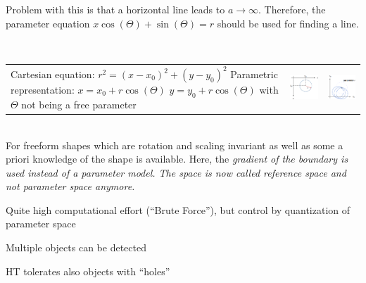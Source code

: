       Problem with this is that a horizontal line leads to $a \rightarrow \infty$. Therefore,
      the parameter equation $x \cos(\Theta) +  \sin(\Theta) = r$ should be used for finding
      a line.
      
      \\
      \begin{tabular}{lll}
        \parbox{8cm}{Cartesian equation:\\
           $r^2 = (x-x_0)^2 + (y-y_0)^2$ \\ \\
           Parametric representation:\\
           $x=x_0 + r \cos(\Theta)$\\
           $y=y_0+r\cos(\Theta)$\\
           with $\Theta$ not being a free parameter}
          & \parbox{5cm}{\includegraphics[width=4cm]{./images/hough_transform_circle.png}}
          & \parbox{5cm}{\includegraphics[width=4cm]{./images/hough_transform_circle2.png}}
      \end{tabular}
      
      
      \\
        For freeform shapes which are rotation and scaling invariant as well as some a priori 
        knowledge of the shape is available.
        Here, the \em gradient of the boundary \em is used instead of a parameter model. The space is now called \em reference
        space \em and not parameter space anymore.
        
        \begin{liste}
        	\item Quite high computational effort (``Brute Force''), but control by quantization of parameter space
        	\item Multiple objects can be detected
        	\item HT tolerates also objects with ``holes'' 
        \end{liste}
    

